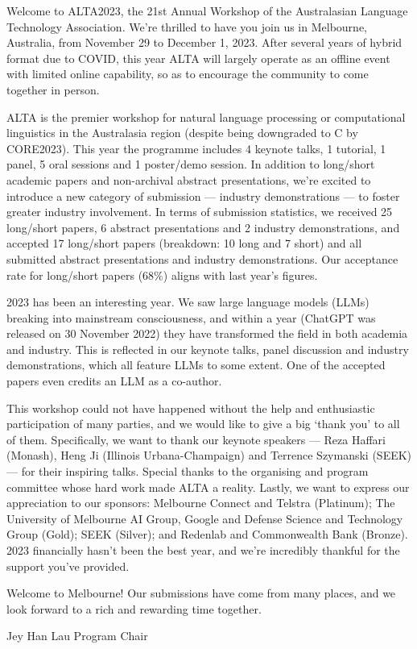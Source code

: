 Welcome to ALTA2023, the 21st Annual Workshop of the Australasian Language Technology Association. We're thrilled to have you join us in Melbourne, Australia, from November 29 to December 1, 2023. After several years of hybrid format due to COVID, this year ALTA will largely operate as an offline event with limited online capability, so as to encourage the community to come together in person.

ALTA is the premier workshop for natural language processing or computational linguistics in the Australasia region (despite being downgraded to C by CORE2023). This year the programme includes 4 keynote talks, 1 tutorial, 1 panel, 5 oral sessions and 1 poster/demo session. In addition to long/short academic papers and non-archival abstract presentations, we're excited to introduce a new category of submission --- industry demonstrations --- to foster greater industry involvement. In terms of submission statistics, we received 25 long/short papers, 6 abstract presentations and 2 industry demonstrations, and accepted 17 long/short papers (breakdown: 10 long and 7 short) and all submitted abstract presentations and industry demonstrations. Our acceptance rate for long/short papers (68\%) aligns with last year's figures.

2023 has been an interesting year. We saw large language models (LLMs) breaking into mainstream consciousness, and within a year (ChatGPT was released on 30 November 2022) they have transformed the field in both academia and industry. This is reflected in our keynote talks, panel discussion and industry demonstrations, which all feature LLMs to some extent. One of the accepted papers even credits an LLM as a co-author.

This workshop could not have happened without the help and enthusiastic participation of many parties, and we would like to give a big `thank you' to all of them. Specifically, we want to thank our keynote speakers --- Reza Haffari (Monash), Heng Ji (Illinois Urbana-Champaign) and Terrence Szymanski (SEEK) --- for their inspiring talks. Special thanks to the organising and program committee whose hard work made ALTA a reality. Lastly, we want to express our appreciation to our sponsors: Melbourne Connect and Telstra (Platinum); The University of Melbourne AI Group, Google and Defense Science and Technology Group (Gold); SEEK (Silver); and Redenlab and Commonwealth Bank (Bronze). 2023 financially hasn't been the best year, and we're incredibly thankful for the support you've provided.

Welcome to Melbourne! Our submissions have come from many places, and we look forward to a rich and rewarding time together.

Jey Han Lau
Program Chair
